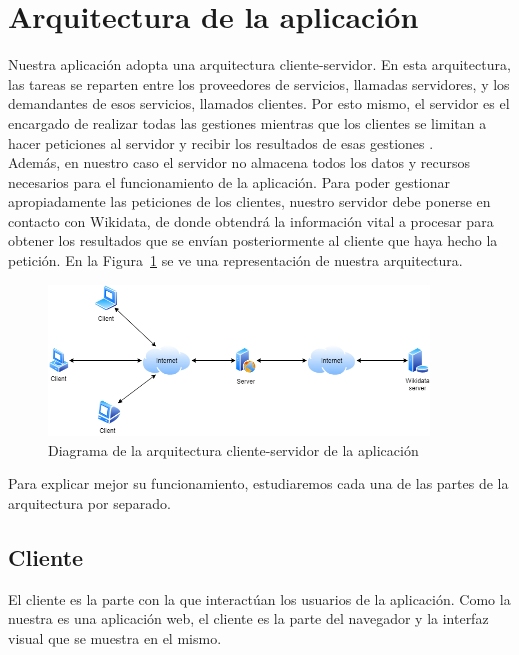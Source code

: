 \section{Arquitectura de la aplicación}

Nuestra aplicación adopta una arquitectura cliente-servidor. En esta arquitectura, las tareas se reparten entre los proveedores de servicios, llamadas servidores, y los demandantes de esos servicios, llamados clientes. Por esto mismo, el servidor es el encargado de realizar todas las gestiones mientras que los clientes se limitan a hacer peticiones al servidor y recibir los resultados de esas gestiones \cite{reese2000}.\\

Además, en nuestro caso el servidor no almacena todos los datos y recursos necesarios para el funcionamiento de la aplicación. Para poder gestionar apropiadamente las peticiones de los clientes, nuestro servidor debe ponerse en contacto con Wikidata, de donde obtendrá la información vital a procesar para obtener los resultados que se envían posteriormente al cliente que haya hecho la petición. En la Figura~\ref{fig:diagramaCS} se ve una representación de nuestra arquitectura.\\

\begin{figure}[h!]
	\centering
	\includegraphics[width = 0.9\textwidth]{Imagenes/Bitmap/Diagrama cliente servidor.png}
	\caption{Diagrama de la arquitectura cliente-servidor de la aplicación}
	\label{fig:diagramaCS}
\end{figure}

Para explicar mejor su funcionamiento, estudiaremos cada una de las partes de la arquitectura por separado.\\

\subsection{Cliente}

El cliente es la parte con la que interactúan los usuarios de la aplicación. Como la nuestra es una aplicación web, el cliente es la parte del navegador y la interfaz visual que se muestra en el mismo.\\

